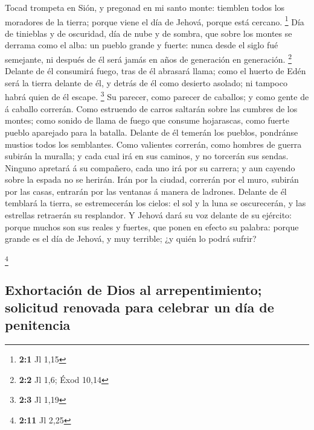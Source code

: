  Tocad trompeta en Sión, y pregonad en mi santo monte:
tiemblen todos los moradores de la tierra; porque viene el día de
Jehová, porque está cercano. \footnote{\textbf{2:1} Jl 1,15}
 Día de tinieblas y de oscuridad, día de nube y de sombra,
que sobre los montes se derrama como el alba: un pueblo grande y fuerte:
nunca desde el siglo fué semejante, ni después de él será jamás en años
de generación en generación. \footnote{\textbf{2:2} Jl 1,6; Éxod 10,14}
 Delante de él consumirá fuego, tras de él abrasará llama;
como el huerto de Edén será la tierra delante de él, y detrás de él como
desierto asolado; ni tampoco habrá quien de él escape. \footnote{\textbf{2:3}
  Jl 1,19}  Su parecer, como parecer de caballos; y como
gente de á caballo correrán.  Como estruendo de carros
saltarán sobre las cumbres de los montes; como sonido de llama de fuego
que consume hojarascas, como fuerte pueblo aparejado para la batalla.
 Delante de él temerán los pueblos, pondránse mustios todos
los semblantes.  Como valientes correrán, como hombres de
guerra subirán la muralla; y cada cual irá en sus caminos, y no torcerán
sus sendas.  Ninguno apretará á su compañero, cada uno irá
por su carrera; y aun cayendo sobre la espada no se herirán.
 Irán por la ciudad, correrán por el muro, subirán por las
casas, entrarán por las ventanas á manera de ladrones. 
Delante de él temblará la tierra, se estremecerán los cielos: el sol y
la luna se oscurecerán, y las estrellas retraerán su resplandor.
 Y Jehová dará su voz delante de su ejército: porque muchos
son sus reales y fuertes, que ponen en efecto su palabra: porque grande
es el día de Jehová, y muy terrible; ¿y quién lo podrá sufrir?

\footnote{\textbf{2:11} Jl 2,25}

\hypertarget{exhortaciuxf3n-de-dios-al-arrepentimiento-solicitud-renovada-para-celebrar-un-duxeda-de-penitencia}{%
\subsection{Exhortación de Dios al arrepentimiento; solicitud renovada
para celebrar un día de
penitencia}\label{exhortaciuxf3n-de-dios-al-arrepentimiento-solicitud-renovada-para-celebrar-un-duxeda-de-penitencia}}

